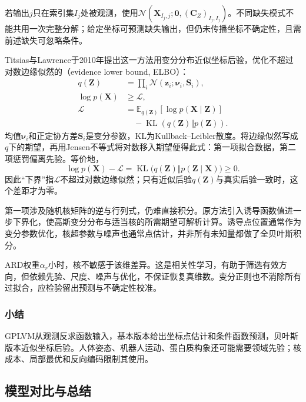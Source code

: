 若输出$j$只在索引集$I_j$处被观测，使用$\mathcal{N}(\bm{X}_{I_j,j};\bm{0},(\bm{C}_Z)_{I_j,I_j})$。不同缺失模式不能共用一次完整分解；给定坐标可预测缺失输出，但仍未传播坐标不确定性，且需前述缺失可忽略条件。

Titsias与Lawrence于2010年提出这一方法用变分分布近似坐标后验，优化不超过对数边缘似然的（evidence lower bound, ELBO）：
\begin{equation}
\label{eq:dim-gplvm-elbo}
\begin{aligned}
q(\bm{Z})&=\prod_i\mathcal{N}(\bm{z}_i;\bm{\nu}_i,\bm{S}_i),\\
\log p(\bm{X})&\geq\mathcal{L},\\
\mathcal{L}
&=\mathbb{E}_{q(\bm{Z})}[\log p(\bm{X}\mid\bm{Z})]\\
&\quad-\operatorname{KL}(q(\bm{Z})\Vert p(\bm{Z})).
\end{aligned}
\end{equation}
均值$\bm{\nu}_i$和正定协方差$\bm{S}_i$是变分参数，KL为Kullback--Leibler散度。将边缘似然写成$q$下的期望，再用Jensen不等式将对数移入期望便得此式：第一项拟合数据，第二项惩罚偏离先验。等价地，
\[
  \log p(\bm{X})-\mathcal{L}
  =\operatorname{KL}\bigl(q(\bm{Z})\Vert p(\bm{Z}\mid\bm{X})\bigr)
  \geq0.
\]
因此“下界”指$\mathcal{L}$不超过对数边缘似然；只有近似后验$q(\bm{Z})$与真实后验一致时，这个差距才为零。

第一项涉及随机核矩阵的逆与行列式，仍难直接积分。原方法引入诱导函数值进一步下界化，使高斯变分分布与适当核的所需期望可解析计算。诱导点位置通常作为变分参数优化，核超参数与噪声也通常点估计，并非所有未知量都做了全贝叶斯积分。

ARD权重$\alpha_r$小时，核不敏感于该维差异。这是相关性学习，有助于筛选有效方向，但依赖先验、尺度、噪声与优化，不保证恢复真维数。变分正则也不消除所有过拟合，应检验留出预测与不确定性校准。

\subsubsection{小结}
\label{sec:dim-gplvm-summary}

GPLVM从观测反求函数输入，基本版本给出坐标点估计和条件函数预测，贝叶斯版本近似坐标后验。人体姿态、机器人运动、蛋白质构象还可能需要领域先验；核成本、局部最优和反向编码限制其使用。

\subsection{模型对比与总结}
\label{sec:dim-probabilistic-comparison}

